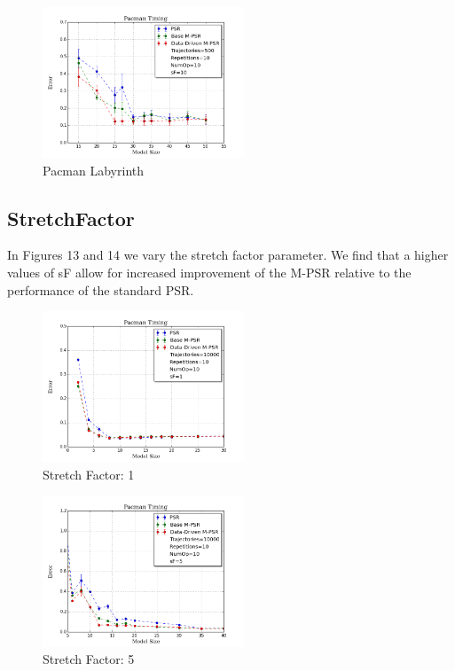 \begin{figure}[ht!]
\centering
\includegraphics[width=60mm]{uCOREPICS/Pacman/Pacman500.png}
\caption{Pacman Labyrinth\label{overflow}}
\end{figure}

\subsection{StretchFactor}

In Figures 13 and 14 we vary the stretch factor parameter. We find that a higher values of sF allow for increased improvement of the M-PSR relative to the performance of the standard PSR.

\begin{figure}[ht!]
\centering
\includegraphics[width=60mm]{uCOREPICS/Pacman/PacmanSF=1.png}
\caption{Stretch Factor: 1\label{overflow}}
\end{figure}

\begin{figure}[ht!]
\centering
\includegraphics[width=60mm]{uCOREPICS/Pacman/PacmanSF=5.png}
\caption{Stretch Factor: 5\label{overflow}}
\end{figure}

